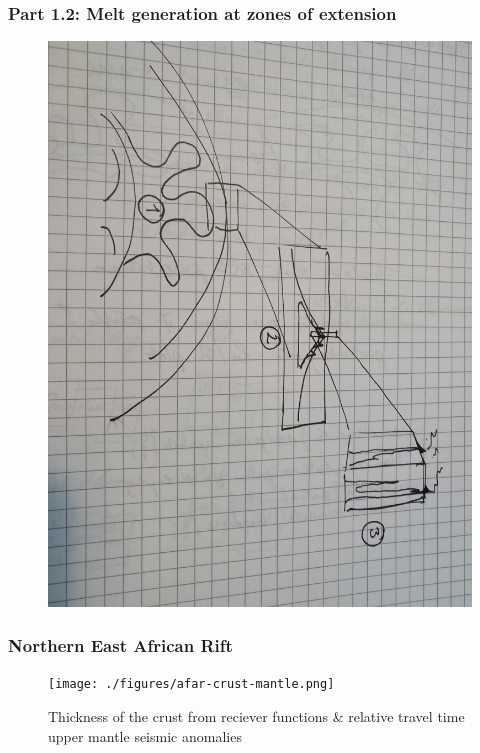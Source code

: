 \documentclass[aspectratio=169]{beamer}
\begin{document}
\begin{frame}
    \frametitle{Part 1.2: Melt generation at zones of extension}
    \begin{figure}
        \includegraphics[height=0.8\paperheight, angle=90]{./pictures/temporary-drawing-2.jpg}
    \end{figure}
\end{frame}

\begin{frame}
    \frametitle{Northern East African Rift}
    \begin{figure}
        \texttt{[image: ./figures/afar-crust-mantle.png]}
        \caption{Thickness of the crust from reciever functions \& relative travel time upper mantle seismic anomalies}
    \end{figure}
\end{frame}
\end{document}
